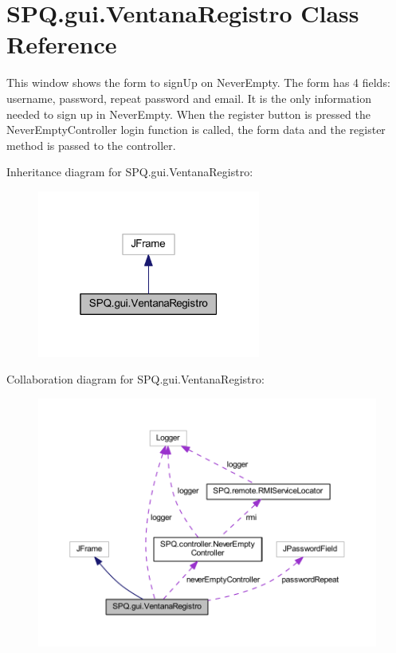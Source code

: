 \hypertarget{class_s_p_q_1_1gui_1_1_ventana_registro}{}\section{S\+P\+Q.\+gui.\+Ventana\+Registro Class Reference}
\label{class_s_p_q_1_1gui_1_1_ventana_registro}


This window shows the form to sign\+Up on Never\+Empty. The form has 4 fields\+: username, password, repeat password and email. It is the only information needed to sign up in Never\+Empty. When the register button is pressed the Never\+Empty\+Controller login function is called, the form data and the register method is passed to the controller.  




Inheritance diagram for S\+P\+Q.\+gui.\+Ventana\+Registro\+:\nopagebreak
\begin{figure}[H]
\begin{center}
\leavevmode
\includegraphics[width=208pt]{class_s_p_q_1_1gui_1_1_ventana_registro__inherit__graph}
\end{center}
\end{figure}


Collaboration diagram for S\+P\+Q.\+gui.\+Ventana\+Registro\+:\nopagebreak
\begin{figure}[H]
\begin{center}
\leavevmode
\includegraphics[width=350pt]{class_s_p_q_1_1gui_1_1_ventana_registro__coll__graph}
\end{center}
\end{figure}

